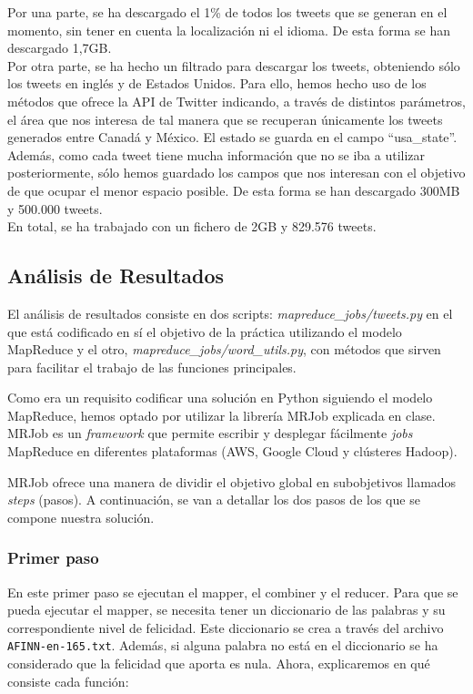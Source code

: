 \documentclass[12pt,a4paper]{article}
\begin{document}
Por una parte, se ha descargado el 1\% de todos los tweets que se generan en el momento, sin tener en cuenta la localización ni el idioma. De esta forma se han descargado 1,7GB.\\
Por otra parte, se ha hecho un filtrado para descargar los tweets, obteniendo sólo los tweets en inglés y de Estados Unidos. Para ello, hemos hecho uso de los métodos que ofrece la API de Twitter indicando, a través de distintos parámetros, el área que nos interesa de tal manera que se recuperan únicamente los tweets generados entre Canadá y México. 
El estado se guarda en el campo ``usa\_state''. Además, como cada tweet tiene mucha información que no se iba a utilizar posteriormente, sólo hemos guardado los campos que nos interesan con el objetivo de que ocupar el menor espacio posible. De esta forma se han descargado 300MB y 500.000 tweets.\\
En total, se ha trabajado con un fichero de 2GB y 829.576 tweets.

\subsection{Análisis de Resultados}

El análisis de resultados consiste en dos scripts: \textit{mapreduce\_jobs/tweets.py} en el que está codificado en sí el objetivo de la práctica utilizando el modelo MapReduce y el otro, \textit{mapreduce\_jobs/word\_utils.py}, con métodos que sirven para facilitar el trabajo de las funciones principales. 

Como era un requisito codificar una solución en Python siguiendo el modelo MapReduce, hemos optado por utilizar la librería MRJob explicada en clase. MRJob es un \textit{framework} que permite escribir y desplegar fácilmente \textit{jobs} MapReduce en diferentes plataformas (AWS, Google Cloud y clústeres Hadoop).

MRJob ofrece una manera de dividir el objetivo global en subobjetivos llamados \textit{steps} (pasos). A continuación, se van a detallar los dos pasos de los que se compone nuestra solución.

\subsubsection{Primer paso}
En este primer paso se ejecutan el mapper, el combiner y el reducer. Para que se pueda ejecutar el mapper, se necesita tener un diccionario de las palabras y su correspondiente nivel de felicidad. Este diccionario se crea a través del archivo \texttt{AFINN-en-165.txt}. Además, si alguna palabra no está en el diccionario se ha considerado que la felicidad que aporta es nula. Ahora, explicaremos en qué consiste cada función:
\end{document}
